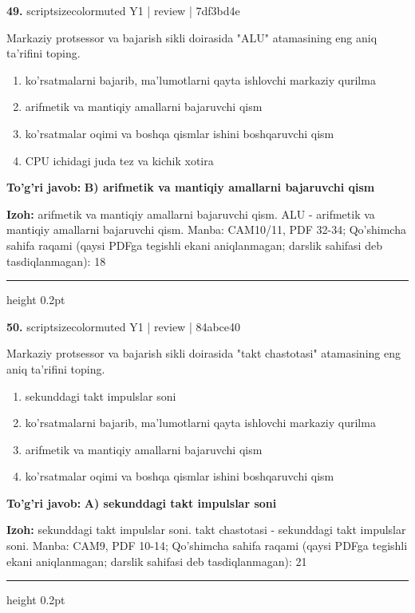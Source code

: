 \documentclass[10pt,a4paper]{article}
\begin{document}
{\bfseries\sffamily\color{ink} 49.} {scriptsizecolor{muted} Y1 | review | 7df3bd4e}
\par
Markaziy protsessor va bajarish sikli doirasida "ALU" atamasining eng aniq ta'rifini toping.
\begin{enumerate}[label=\Alph*),leftmargin=9mm]
\item ko'rsatmalarni bajarib, ma'lumotlarni qayta ishlovchi markaziy qurilma
\item arifmetik va mantiqiy amallarni bajaruvchi qism
\item ko'rsatmalar oqimi va boshqa qismlar ishini boshqaruvchi qism
\item CPU ichidagi juda tez va kichik xotira
\end{enumerate}
\begin{tcolorbox}[enhanced,breakable,colback=teal!4,colframe=teal!60!black,boxrule=0.45pt,arc=1.2mm,left=2.7mm,right=2.7mm,top=1.8mm,bottom=1.8mm,before skip=2mm,after skip=2mm]
{\bfseries\sffamily\color{teal}To'g'ri javob:} \textbf{B) arifmetik va mantiqiy amallarni bajaruvchi qism}
\par\smallskip
{\bfseries Izoh:} arifmetik va mantiqiy amallarni bajaruvchi qism. ALU - arifmetik va mantiqiy amallarni bajaruvchi qism. Manba: CAM10/11, PDF 32-34; Qo'shimcha sahifa raqami (qaysi PDFga tegishli ekani aniqlanmagan; darslik sahifasi deb tasdiqlanmagan): 18
\end{tcolorbox}
\vspace{2mm}\hrule height 0.2pt\vspace{3mm}

{\bfseries\sffamily\color{ink} 50.} {scriptsizecolor{muted} Y1 | review | 84abce40}
\par
Markaziy protsessor va bajarish sikli doirasida "takt chastotasi" atamasining eng aniq ta'rifini toping.
\begin{enumerate}[label=\Alph*),leftmargin=9mm]
\item sekunddagi takt impulslar soni
\item ko'rsatmalarni bajarib, ma'lumotlarni qayta ishlovchi markaziy qurilma
\item arifmetik va mantiqiy amallarni bajaruvchi qism
\item ko'rsatmalar oqimi va boshqa qismlar ishini boshqaruvchi qism
\end{enumerate}
\begin{tcolorbox}[enhanced,breakable,colback=teal!4,colframe=teal!60!black,boxrule=0.45pt,arc=1.2mm,left=2.7mm,right=2.7mm,top=1.8mm,bottom=1.8mm,before skip=2mm,after skip=2mm]
{\bfseries\sffamily\color{teal}To'g'ri javob:} \textbf{A) sekunddagi takt impulslar soni}
\par\smallskip
{\bfseries Izoh:} sekunddagi takt impulslar soni. takt chastotasi - sekunddagi takt impulslar soni. Manba: CAM9, PDF 10-14; Qo'shimcha sahifa raqami (qaysi PDFga tegishli ekani aniqlanmagan; darslik sahifasi deb tasdiqlanmagan): 21
\end{tcolorbox}
\vspace{2mm}\hrule height 0.2pt\vspace{3mm}
\end{document}
